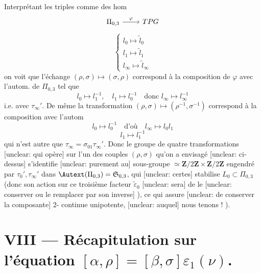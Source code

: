 \begin{enumerate}
Interprétant les triples comme des hom
$$
\begin{tikzcd} \Pi_{0,3} \arrow[r, "\varphi"] & TPG \end{tikzcd}
$$
$$
\begin{cases} l_0 \mapsto \tilde{l}_0 \\ l_1 \mapsto \tilde{l}_1 \\ l_\infty \mapsto \tilde{l}_\infty \end{cases}
$$
on voit que l'échange $(\rho, \sigma) \mapsto (\sigma, \rho)$ correspond
à la composition de $\varphi$ avec l'autom. de $\Pi_{0,3}$ tel que
$$
l_0 \mapsto l_1^{-1}, \quad l_1 \mapsto l_0^{-1} \quad \text{donc } l_\infty \mapsto l_\infty^{-1}
$$
i.e. avec $\tau_\infty'$. De même la transformation
$(\rho, \sigma) \mapsto (\rho^{-1}, \sigma^{-1})$ correspond à la composition avec l'autom
$$
l_0 \mapsto l_0^{-1} \quad \text{d'où} \quad l_\infty \mapsto l_0 l_1
$$
$$
l_1 \mapsto l_1^{-1}
$$
qui n'est autre que $\tau_\infty = \sigma_{01} \tau_\infty'$. Donc le groupe
de quatre transformations [unclear: qui opère] sur l'un
des couples $(\rho, \sigma)$ qu'on a envisagé [unclear: ci-dessus]
 s'identifie [unclear: purement au] sous-groupe $\simeq \mathbf{Z}/2\mathbf{Z} \times \mathbf{Z}/2\mathbf{Z}$
engendré par $\tau_0', \tau_\infty'$ dans $\Autext(\Pi_{0,3}) = \mathfrak{S}_{0,3}$,
qui [unclear: certes] stabilise $L_0 \subset \Pi_{0,3}$ (donc son action
sur ce troisième facteur $\tilde{\varepsilon}_0$ [unclear: sera]
de le [unclear: conserver ou le remplacer par son inverse] ),
ce qui assure [unclear: de conserver la composante] 2- continue
unipotente, [unclear: auquel] nous tenons ! ).

\newpage


\section*{VIII --- Récapitulation sur l'équation $[\alpha, \rho] = [\beta, \sigma] \varepsilon_1(\nu)$. }


\end{enumerate}
